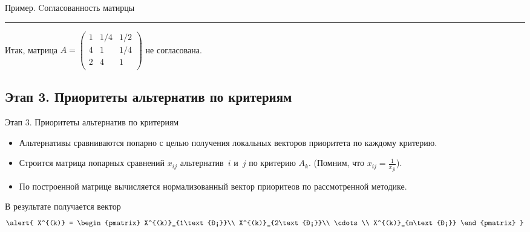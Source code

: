 \documentclass[unicode,11pt,notheorems,xcolor=table]{beamer}
\begin{document}
\begin{frame}[allowframebreaks]{Пример. Cогласованность матирцы}
    \bigskip
    \hrule

    \bigskip
    Итак, матрица  $A=\begin{pmatrix}
        1 & 1/4 & 1/2 \\
        4 & 1 & 1/4 \\
        2 & 4  & 1\\
    \end{pmatrix}$  не согласована.
\end{frame}

\subsection{Этап 3. Приоритеты альтернатив по критериям}
\begin{frame}{Этап 3. Приоритеты альтернатив по критериям}
    \begin{itemize}
        \item Альтернативы сравниваются попарно с целью получения локальных векторов приоритета по каждому критерию.
        \item Строится матрица попарных сравнений $x_{ij}$ альтернатив~$i$ и~$j$ по  критерию $A_k$. (Помним, что $x_{ij}=\frac{1}{x_{ji}}$).
        \item По построенной матрице вычисляется нормализованный вектор приоритеов по рассмотренной методике.
    \end{itemize}
    В результате получается вектор 
    $$
    \alert{
    X^{(k)} = \begin{pmatrix}
        X^{(k)}_{1\text{н}}\\ X^{(k)}_{2\text{н}}\\ \cdots \\ X^{(k)}_{m\text{н}}
    \end{pmatrix}
    }
    $$

\end{frame}
\end{document}
